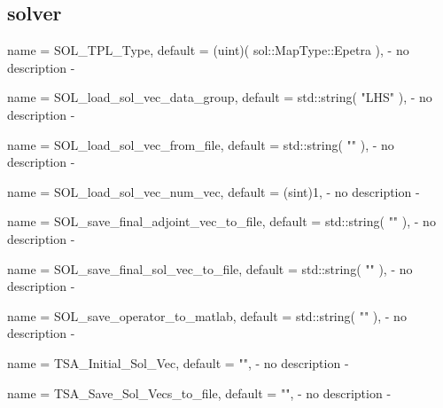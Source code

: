 \subsection{solver}

\begin{parameter}{
    name    = {SOL_TPL_Type},
    default = {(uint)( sol::MapType::Epetra )},
}
- no description -
\end{parameter}

\begin{parameter}{
    name    = {SOL_load_sol_vec_data_group},
    default = {std::string( "LHS" )},
}
- no description -
\end{parameter}

\begin{parameter}{
    name    = {SOL_load_sol_vec_from_file},
    default = {std::string( "" )},
}
- no description -
\end{parameter}

\begin{parameter}{
    name    = {SOL_load_sol_vec_num_vec},
    default = {(sint)1},
}
- no description -
\end{parameter}

\begin{parameter}{
    name    = {SOL_save_final_adjoint_vec_to_file},
    default = {std::string( "" )},
}
- no description -
\end{parameter}

\begin{parameter}{
    name    = {SOL_save_final_sol_vec_to_file},
    default = {std::string( "" )},
}
- no description -
\end{parameter}

\begin{parameter}{
    name    = {SOL_save_operator_to_matlab},
    default = {std::string( "" )},
}
- no description -
\end{parameter}

\begin{parameter}{
    name    = {TSA_Initial_Sol_Vec},
    default = {""},
}
- no description -
\end{parameter}

\begin{parameter}{
    name    = {TSA_Save_Sol_Vecs_to_file},
    default = {""},
}
- no description -
\end{parameter}

